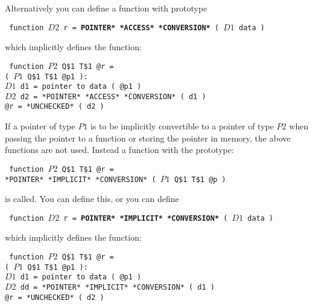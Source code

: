 \documentclass[12pt]{article}
\newcommand{\ttkey}[1]{{\tt \bfseries #1}}
\newenvironment{indpar}[1][0.3in]%
	{\begin{list}{}%
		     {\setlength{\itemsep}{0in}%
		      \setlength{\topsep}{0in}%
		      \setlength{\parsep}{1ex}%
		      \setlength{\labelwidth}{#1}%
		      \setlength{\leftmargin}{#1}%
		      \addtolength{\leftmargin}{\labelsep}}%
	 \item}%
	{\end{list}}
\begin{document}
Alternatively you can define a function with prototype
\begin{indpar} \tt
function $D2$ r = \ttkey{*POINTER* *ACCESS* *CONVERSION*} ( $D1$ data )
\end{indpar}
which implicitly defines the function:
\begin{indpar} \tt
function $P2$ Q\$1 T\$1 @r = \\
\hspace*{1in}\ttkey{*POINTER* *ACCESS* *CONVERSION*}
	( $P1$ Q\$1 T\$1 @p1 ): \\
\hspace*{0.3in}$D1$ d1 = pointer to data ( @p1 ) \\
\hspace*{0.3in}$D2$ d2 = *POINTER* *ACCESS* *CONVERSION* ( d1 ) \\
\hspace*{0.3in}@r = *UNCHECKED* ( d2 )
\end{indpar}

If a pointer of type $P1$ is to be implicitly
convertible to a pointer of type $P2$ when passing the
pointer to a function or storing the pointer in memory,
the above functions are not used.  Instead a function with
the prototype:
\begin{indpar} \tt
function $P2$ Q\$1 T\$1 @r = \\
\hspace*{1in}*POINTER* *IMPLICIT* *CONVERSION* ( $P1$ Q\$1 T\$1 @p )
\end{indpar}
is called.  You can define this, or you can define
\begin{indpar} \tt
function $D2$ r = \ttkey{*POINTER* *IMPLICIT* *CONVERSION*} ( $D1$ data )
\end{indpar}
which implicitly defines the function:
\begin{indpar} \tt
function $P2$ Q\$1 T\$1 @r = \\
\hspace*{1in}\ttkey{*POINTER* *IMPLICIT* *CONVERSION*}
	( $P1$ Q\$1 T\$1 @p1 ): \\
\hspace*{0.3in}$D1$ d1 = pointer to data ( @p1 ) \\
\hspace*{0.3in}$D2$ dd = *POINTER* *IMPLICIT* *CONVERSION* ( d1 ) \\
\hspace*{0.3in}@r = *UNCHECKED* ( d2 )
\end{indpar}
\end{document}
